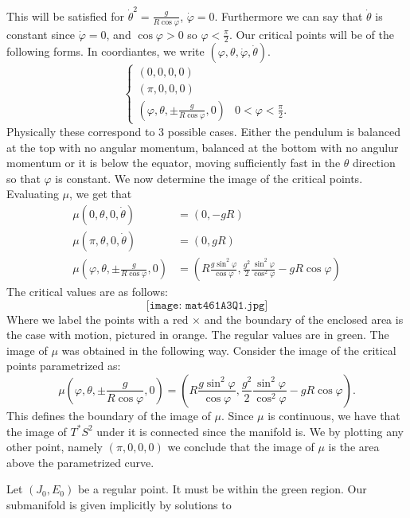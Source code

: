\documentclass[12pt, a4paper]{article}
\theoremstyle{definition}
\begin{document}
This will be satisfied for $\dot{\theta}^2 = \frac{ g }{ R \cos \varphi }$, $\dot{\varphi} = 0$. Furthermore we can say that $\dot{\theta} $ is constant since $\dot{\varphi} = 0$, and $\cos{\varphi} >0$ so $\varphi < \frac{ \pi }{ 2 }$. 
Our critical points will be of the following forms. In coordiantes, we write $(\varphi, \theta, \dot{\varphi}, \dot \theta)$.
$$ \begin{cases} 
	\left( 0, 0, 0,0 \right)
	\\ \left( \pi, 0 ,0, 0 \right)
	\\  \left( \varphi, \theta, \pm \frac{ g }{ R \cos \varphi }, 0 \right) & \text{$0< \varphi < \frac{ \pi }{ 2 }$.} 
\end{cases} $$ 
Physically these correspond to 3 possible cases. Either the pendulum is balanced at the top with no angular momentum, balanced at the bottom with no angulur momentum or it is below the equator, moving sufficiently fast in the $\theta$ direction so that $\varphi$ is constant.  
We now determine the image of the critical points. Evaluating $\mu$, we get that 
\begin{align*}
	\mu \left( 0 , \theta , 0 ,\dot{\theta}  \right) & = \left( 0,- gR \right)
	\\ \mu \left( \pi, \theta, 0 ,\dot{\theta} \right) & = \left( 0, gR \right)
	\\ \mu \left( \varphi , \theta , \pm \frac{ g }{ R \cos \varphi  }, 0 \right) & = \left( R \frac{ g\sin^2 \varphi }{ \cos \varphi },  \frac{ g^2 }{ 2 }\frac{  \sin^2 \varphi  }{  \cos^2 \varphi} - gR \cos \varphi \right)
\end{align*}
The critical values are as follows:
$$ \texttt{[image: mat461A3Q1.jpg]} $$ 
Where we label the points with a red $\times$ and the boundary of the enclosed area is the case with motion, pictured in orange. The regular values are in green. The image of $\mu$ was obtained in the following way. Consider the image of the critical points parametrized as:
$$  \mu \left( \varphi , \theta , \pm \frac{ g }{ R \cos \varphi  }, 0 \right)  = \left( R \frac{ g\sin^2 \varphi }{ \cos \varphi },  \frac{ g^2 }{ 2 }\frac{  \sin^2 \varphi  }{  \cos^2 \varphi} - gR \cos \varphi \right).
 $$
 This defines the boundary of the image of $\mu$. Since $\mu$ is continuous, we have that the image of $T^\ast S^2$ under it is connected since the manifold is. We by plotting any other point, namely $(\pi, 0, 0 ,0)$ we conclude that the image of $\mu$ is the area above the parametrized curve. 
\item Let $(J_0, E_0)$ be a regular point. It must be within the green region. Our submanifold is given implicitly by solutions to
\end{document}
